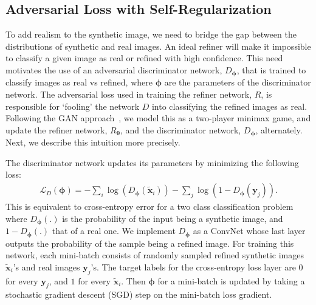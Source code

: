 \documentclass[10pt,twocolumn,letterpaper]{article}
\begin{document}
\subsection{Adversarial Loss with Self-Regularization}

To add realism to the synthetic image, we need to bridge the gap between the distributions of synthetic and real images. 
An ideal refiner will make it impossible to classify a given image as real or refined with high confidence. 
This need motivates the use of an adversarial discriminator network, $D_{\boldsymbol{\phi}} $, that is trained to classify images as real vs refined, where $\boldsymbol \phi $ are the parameters of the discriminator network. 
The adversarial loss used in training the refiner network, $R$, is responsible for `fooling' the network $D$ into classifying the refined images as real. 
Following the GAN approach~\cite{Goodfellow14}, we model this as a two-player minimax game, and update the refiner network, $R_{\boldsymbol{\theta}}$, and the discriminator network, $D_{\boldsymbol{\phi}}$, alternately. 
Next, we describe this intuition more precisely.

The discriminator network updates its parameters by minimizing the following loss:
\begin{align}
{\mathcal L}_D (\boldsymbol \phi) =- \sum_i\log(D_{\boldsymbol \phi}(\tilde{\mathbf x}_i)) - \sum_j\log (1 - D_{\boldsymbol \phi}(\mathbf y_j)) .
\label{eq:loss_D}
\end{align}
This is equivalent to cross-entropy error for a two class classification problem where $D_{\boldsymbol \phi}(.)$ is the probability of the input being a synthetic image, and $1- D_{\boldsymbol \phi}(.)$  that of a real one. 
We implement $D_{\boldsymbol \phi}$ as a ConvNet whose last layer outputs the probability of the sample being a refined image. 
For training this network, each mini-batch consists of randomly sampled refined synthetic images $\tilde{\mathbf x}_i$'s and real images $\mathbf y_j$'s. 
The target labels for the cross-entropy loss layer are $0$ for every $\mathbf y_j$, and $1$ for every $\tilde{\mathbf x}_i$. 
Then $\boldsymbol \phi$ for a mini-batch is updated by taking a stochastic gradient descent (SGD) step on the  mini-batch loss gradient. 
\end{document}
